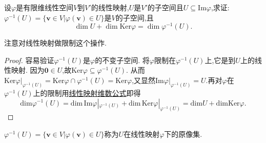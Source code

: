 \documentclass[../../main.tex]{subfiles}%
\begin{document}
\begin{example}
设\(\varphi\)是有限维线性空间\(V\)到\(V'\)的线性映射,\(U\)是\(V'\)的子空间且\(U\subseteq\text{Im}\varphi\),求证:\(\varphi^{-1}(U)=\{\boldsymbol{v}\in V|\varphi(\boldsymbol{v})\in U\}\)是\(V\)的子空间,且
\[
\dim U+\dim\text{Ker}\varphi=\dim\varphi^{-1}(U).
\]
\end{example}
\begin{note}
注意对线性映射做限制这个操作.
\end{note}
\begin{proof}
容易验证\(\varphi^{-1}(U)\)是\(\varphi\)的不变子空间. 将\(\varphi\)限制在\(\varphi^{-1}(U)\)上,它是到\(U\)上的线性映射. 因为\(\boldsymbol{0}\in U\),故\(\text{Ker}\varphi\subseteq\varphi^{-1}(U)\). 从而$\text{Ker}\varphi |_{\varphi ^{-1}\left( U \right)}=\mathrm{Ker}\varphi \cap \varphi ^{-1}\left( U \right) =\mathrm{Ker}\varphi $,又显然$\text{Im}\varphi |_{\varphi ^{-1}\left( U \right)}=U$.再对\(\varphi\)在\(\varphi^{-1}(U)\)上的限制用\hyperref[theorem:线性映射的维数公式]{线性映射维数公式}即得
\[
\mathrm{dim}\varphi ^{-1}\left( U \right) =\mathrm{dim}\,\mathrm{Im}\varphi |_{\varphi ^{-1}\left( U \right)}+\mathrm{dim}\,\mathrm{Ker}\varphi |_{\varphi ^{-1}\left( U \right)}=\mathrm{dim}U+\mathrm{dimKer}\varphi .
\]
\end{proof}
\begin{remark}
\(\varphi^{-1}(U)=\{\boldsymbol{v}\in V|\varphi(\boldsymbol{v})\in U\}\)称为$U$在线性映射$\varphi$下的原像集.
\end{remark}
\end{document}
